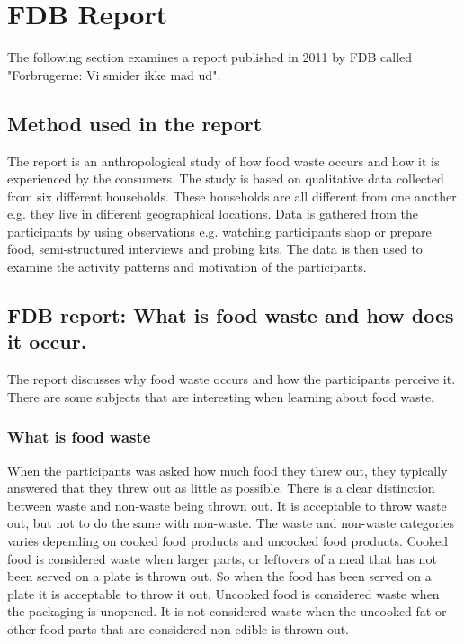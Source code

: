 \section{FDB Report}
The following section examines a report published in 2011 by FDB called "Forbrugerne: Vi smider ikke mad ud"\cite{madSpild_FDB}.
\subsection{Method used in the report}
The report is an anthropological study of how food waste occurs and how it is experienced by the consumers. The study is based on qualitative data collected from six different households. These households are all different from one another e.g. they live in different geographical locations. Data is gathered from the participants by using observations e.g. watching participants shop or prepare food, semi-structured interviews and probing kits. The data is then used to examine the activity patterns and motivation of the participants.

\subsection{FDB report: What is food waste and how does it occur.}
The report discusses why food waste occurs and how the participants perceive it. There are some subjects that are interesting when learning about food waste. 

\subsubsection{What is food waste}
When the participants was asked how much food they threw out, they typically answered that they threw out as little as possible. There is a clear distinction between waste and non-waste being thrown out. It is acceptable to throw waste out, but not to do the same with non-waste. The waste and non-waste categories varies depending on cooked food products and uncooked food products. Cooked food is considered waste when larger parts, or leftovers of a meal that has not been served on a plate is thrown out. So when the food has been served on a plate it is acceptable to throw it out. Uncooked food is considered waste when the packaging is unopened. It is not considered waste when the uncooked fat or other food parts that are considered non-edible is thrown out.

